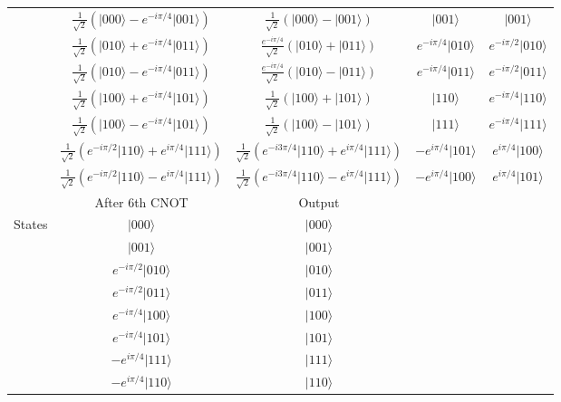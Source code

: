 \documentclass[en]{sol-man}
\begin{document}
\begin{pf}
\begin{table}[h]
\begin{tabular}{|c|c|c|c|c|}
             & $\frac{1}{\sqrt{2}}(\lvert 000\rangle-e^{-i\pi/4}\lvert 001\rangle)$ & $\frac{1}{\sqrt{2}}(\lvert 000\rangle-\lvert 001\rangle)$ & $\lvert 001\rangle$ & $\lvert 001\rangle$ \\ \cline{2-5} 
             & $\frac{1}{\sqrt{2}}(\lvert 010\rangle+e^{-i\pi/4}\lvert 011\rangle)$ & $\frac{e^{-i\pi/4}}{\sqrt{2}}(\lvert 010\rangle+\lvert 011\rangle)$ & $e^{-i\pi/4}\lvert 010\rangle$ & $e^{-i\pi/2}\lvert 010\rangle$ \\ \cline{2-5} 
             & $\frac{1}{\sqrt{2}}(\lvert 010\rangle-e^{-i\pi/4}\lvert 011\rangle)$ & $\frac{e^{-i\pi/4}}{\sqrt{2}}(\lvert 010\rangle-\lvert 011\rangle)$ & $e^{-i\pi/4}\lvert 011\rangle$ & $e^{-i\pi/2}\lvert 011\rangle$ \\ \cline{2-5} 
             & $\frac{1}{\sqrt{2}}(\lvert 100\rangle+e^{-i\pi/4}\lvert 101\rangle)$ & $\frac{1}{\sqrt{2}}(\lvert 100\rangle+\lvert 101\rangle)$ & $\lvert 110\rangle$ & $e^{-i\pi/4}\lvert 110\rangle$ \\ \cline{2-5} 
             & $\frac{1}{\sqrt{2}}(\lvert 100\rangle-e^{-i\pi/4}\lvert 101\rangle)$ & $\frac{1}{\sqrt{2}}(\lvert 100\rangle-\lvert 101\rangle)$ & $\lvert 111\rangle$ & $e^{-i\pi/4}\lvert 111\rangle$ \\ \cline{2-5} 
             & $\frac{1}{\sqrt{2}}(e^{-i\pi/2}\lvert 110\rangle+e^{i\pi/4}\lvert 111\rangle)$ & $\frac{1}{\sqrt{2}}(e^{-i3\pi/4}\lvert 110\rangle+e^{i\pi/4}\lvert 111\rangle)$ & $-e^{i\pi/4}\lvert 101\rangle$ & $e^{i\pi/4}\lvert 100\rangle$ \\ \cline{2-5} 
             & $\frac{1}{\sqrt{2}}(e^{-i\pi/2}\lvert 110\rangle-e^{i\pi/4}\lvert 111\rangle)$ & $\frac{1}{\sqrt{2}}(e^{-i3\pi/4}\lvert 110\rangle-e^{i\pi/4}\lvert 111\rangle)$ & $-e^{i\pi/4}\lvert 100\rangle$ & $e^{i\pi/4}\lvert 101\rangle$ \\ \hline\hline
             & After $6$th CNOT & Output &  &  \\ \hline
            \multirow{8}{*}{States} & $\lvert 000\rangle$ & $\lvert 000\rangle$ &  &  \\ \cline{2-5} 
             & $\lvert 001\rangle$ & $\lvert 001\rangle$ &  &  \\ \cline{2-5} 
             & $e^{-i\pi/2}\lvert 010\rangle$ & $\lvert 010\rangle$ &  &  \\ \cline{2-5} 
             & $e^{-i\pi/2}\lvert 011\rangle$ & $\lvert 011\rangle$ &  &  \\ \cline{2-5} 
             & $e^{-i\pi/4}\lvert 100\rangle$ & $\lvert 100\rangle$ &  &  \\ \cline{2-5} 
             & $e^{-i\pi/4}\lvert 101\rangle$ & $\lvert 101\rangle$ &  &  \\ \cline{2-5} 
             & $-e^{i\pi/4}\lvert 111\rangle$ & $\lvert 111\rangle$ &  &  \\ \cline{2-5} 
             & $-e^{i\pi/4}\lvert 110\rangle$ & $\lvert 110\rangle$ &  &  \\ \hline
        \end{tabular}
    \end{table}


\end{pf}
\end{document}
